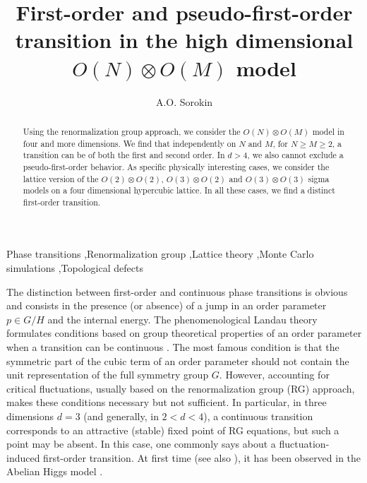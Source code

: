 \documentclass[final,twocolumn]{elsarticle}
\begin{document}
\def\bfe{\mathbf{e}}
\def\bfx{\mathbf{x}}
\def\tr{\mathrm{tr}}

\begin{frontmatter}

\title{First-order and pseudo-first-order transition in the high dimensional $O(N)\otimes O(M)$ model}

\author{A.O. Sorokin}

\address{Petersburg Nuclear Physics Institute, NRC Kurchatov Institute, 188300 Orlova Roscha, Gatchina, Russia}

\begin{abstract}
Using the renormalization group approach, we consider the $O(N)\otimes O(M)$ model in four and more dimensions. We find that independently on $N$ and $M$, for $N\geq M\geq 2$, a transition can be of both the first and second order. In $d>4$, we also cannot exclude a pseudo-first-order behavior. As specific physically interesting cases, we consider the lattice version of the $O(2)\otimes O(2)$, $O(3)\otimes O(2)$ and $O(3)\otimes O(3)$ sigma models on a four dimensional hypercubic lattice. In all these cases, we find a distinct first-order transition.
\end{abstract}

\begin{keyword}
Phase transitions \sep Renormalization group \sep Lattice theory \sep Monte Carlo simulations \sep Topological defects


\end{keyword}

\end{frontmatter}

The distinction between first-order and continuous phase transitions is obvious and consists in the presence (or absence) of a jump in an order parameter $p\in G/H$ and the internal energy. The phenomenological Landau theory formulates conditions based on group theoretical properties of an order parameter when a transition can be continuous \cite{Landau37,Lifshitz41}. The most famous condition is that the symmetric part of the cubic term of an order parameter should not contain the unit representation of the full symmetry group $G$. However, accounting for critical fluctuations, usually based on the renormalization group (RG) approach, makes these conditions necessary but not sufficient. In particular, in three dimensions $d=3$ (and generally, in $2<d<4$), a continuous transition corresponds to an attractive (stable) fixed point of RG equations, but such a point may be absent. In this case, one commonly says about a fluctuation-induced first-order transition. At first time \cite{Halperin74} (see also \cite{Coleman73}), it has been observed in the Abelian Higgs model \cite{Ginzburg50}.
\end{document}
